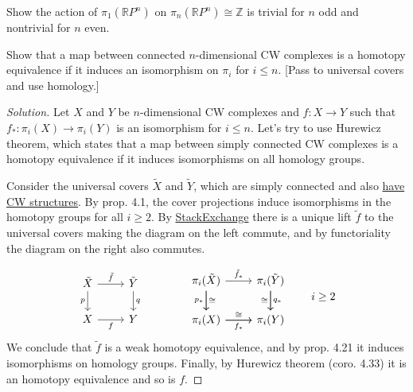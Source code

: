 \documentclass{article}
\numberwithin{equation}{section}
\newcommand{\R}{\mathbb{R}}
\newcommand{\Z}{\mathbb{Z}}
\begin{document}
\begin{exercise}[4.2.2]
	Show the action of $\pi_1(\R P^n)$ on $\pi_n(\R P^n)\cong\Z$ is trivial for $n$ odd and nontrivial for $n$ even.
\end{exercise}

\begin{exercise}[4.2.13]
	Show that a map between connected $n$-dimensional CW complexes is a homotopy equivalence if it induces an isomorphism on $\pi_i$ for $i\leq n$. [Pass to universal covers and use homology.]
\end{exercise}
\begin{proof}[Solution]
	Let $X$ and $Y$ be $n$-dimensional CW complexes and $f:X\to Y$ such that $f_*:\pi_i(X)\to\pi_i(Y)$ is an isomorphism for $i\leq n$. Let's try to use Hurewicz theorem, which states that a map between simply connected CW complexes is a homotopy equivalence if it induces isomorphisms on all homology groups.
	
	Consider the universal covers $\tilde{X}$ and $\tilde{Y}$, which are simply connected and also \href{https://math.stackexchange.com/questions/1148411/universal-covering-space-of-cw-complex-has-cw-complex-structure/1148918#1148918}{have CW structures}. By prop. 4.1, the cover projections induce isomorphisms in the homotopy groups for all $i\geq2$. By \href{https://math.stackexchange.com/questions/2206906/unique-map-of-universal-covering-space}{StackExchange} there is a unique lift $\tilde{f}$ to the universal covers making the diagram on the left commute, and by functoriality the diagram on the right also commutes.
	
	
	
	\[\begin{tikzcd}
		\tilde{X}\arrow[d,swap,"p"]\arrow[r,"\tilde{f}"]&\tilde{Y}\arrow[d,"q"]\\
		X\arrow[r,"f",swap]&Y
	\end{tikzcd}\qquad\qquad
	\begin{tikzcd}
		\pi_i(\tilde{X})\arrow[r,"\tilde{f}_*"]\arrow[d,swap,"p_*"]\arrow[d,"\cong"]&\pi_i(\tilde{Y})\arrow[d,"q_*"]\arrow[d,swap,"\cong"]\\
		\pi_i(X)\arrow[r,"f_*",swap]\arrow[r,"\cong"]&\pi_i(Y)
	\end{tikzcd}\qquad i\geq2\]
	We conclude that $\tilde{f}$ {\color{red}is a weak homotopy equivalence}, and by prop. 4.21 it induces isomorphisms on homology groups. Finally, by Hurewicz theorem (coro. 4.33) it is an homotopy equivalence and so is $f$.
\end{proof}
\end{document}
